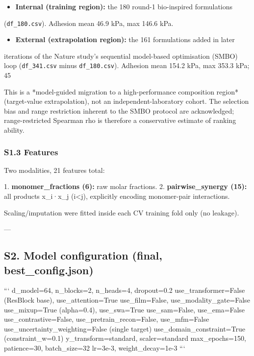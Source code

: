 \documentclass[utf8]{frontiers_suppmat}
\begin{document}
\begin{itemize}
\item \textbf{Internal (training region):} the 180 round-1 bio-inspired formulations
\end{itemize}
  (\texttt{df_180.csv}). Adhesion mean 46.9 kPa, max 146.6 kPa.
\begin{itemize}
\item \textbf{External (extrapolation region):} the 161 formulations added in later
\end{itemize}
  iterations of the Nature study's sequential model-based optimisation (SMBO)
  loop (\texttt{df_341.csv} minus \texttt{df_180.csv}). Adhesion mean 154.2 kPa, max
  353.3 kPa; 45%

This is a *model-guided migration to a high-performance composition region*
(target-value extrapolation), not an independent-laboratory cohort. The
selection bias and range restriction inherent to the SMBO protocol are
acknowledged; range-restricted Spearman rho is therefore a conservative
estimate of ranking ability.

\subsubsection{S1.3 Features}

Two modalities, 21 features total:

1. \textbf{monomer_fractions (6):} raw molar fractions.
2. \textbf{pairwise_synergy (15):} all products x_i·x_j (i<j), explicitly encoding
   monomer-pair interactions.

Scaling/imputation were fitted inside each CV training fold only
(no leakage).

---

\subsection{S2. Model configuration (final, best_config.json)}

```
d_model=64, n_blocks=2, n_heads=4, dropout=0.2
use_transformer=False (ResBlock base), use_attention=True
use_film=False, use_modality_gate=False
use_mixup=True (alpha=0.4), use_swa=True
use_sam=False, use_ema=False
use_contrastive=False, use_pretrain_recon=False, use_mfm=False
use_uncertainty_weighting=False (single target)
use_domain_constraint=True (constraint_w=0.1)
y_transform=standard, scaler=standard
max_epochs=150, patience=30, batch_size=32
lr=3e-3, weight_decay=1e-3
```
\end{document}
